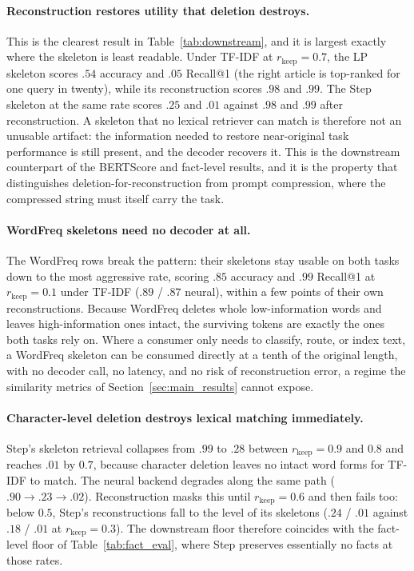 \documentclass[11pt]{article}
\newcommand{\rkeep}{r_{\mathrm{keep}}}
\begin{document}
\paragraph{Reconstruction restores utility that deletion destroys.}
This is the clearest result in Table~\ref{tab:downstream}, and it is largest exactly where the skeleton is
least readable. Under TF-IDF at $\rkeep = 0.7$, the LP skeleton scores $.54$ accuracy and $.05$ Recall@1 (the right article is top-ranked for one query in twenty), while its reconstruction scores $.98$ and $.99$. The Step skeleton at the
same rate scores $.25$ and $.01$ against $.98$ and $.99$ after reconstruction. A skeleton that no lexical
retriever can match is therefore not an unusable artifact: the information needed to restore near-original
task performance is still present, and the decoder recovers it. This is the downstream counterpart of the
BERTScore and fact-level results, and it is the property that distinguishes deletion-for-reconstruction
from prompt compression, where the compressed string must itself carry the task.

\paragraph{WordFreq skeletons need no decoder at all.}
The WordFreq rows break the pattern: their skeletons stay usable on both tasks down to the most aggressive
rate, scoring $.85$ accuracy and $.99$ Recall@1 at $\rkeep = 0.1$ under TF-IDF ($.89$ / $.87$ neural),
within a few points of their own reconstructions. Because WordFreq deletes whole low-information words and
leaves high-information ones intact, the surviving tokens are exactly the ones both tasks rely on. Where a
consumer only needs to classify, route, or index text, a WordFreq skeleton can be consumed directly at a
tenth of the original length, with no decoder call, no latency, and no risk of reconstruction error, a regime the similarity metrics of Section~\ref{sec:main_results} cannot expose.

\paragraph{Character-level deletion destroys lexical matching immediately.}
Step's skeleton retrieval collapses from $.99$ to $.28$ between $\rkeep = 0.9$ and $0.8$ and reaches $.01$
by $0.7$, because character deletion leaves no intact word forms for TF-IDF to match. The neural backend
degrades along the same path ($.90 \to .23 \to .02$). Reconstruction masks this until $\rkeep = 0.6$ and
then fails too: below $0.5$, Step's reconstructions fall to the level of its skeletons ($.24$ / $.01$
against $.18$ / $.01$ at $\rkeep = 0.3$). The downstream floor therefore coincides with the fact-level floor of
Table~\ref{tab:fact_eval}, where Step preserves essentially no facts at those rates.
\end{document}
